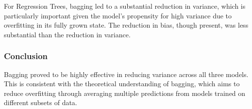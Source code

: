 \documentclass[12pt,titlepage]{article}
\begin{document}
For Regression Trees, bagging led to a substantial reduction in variance, which is particularly important given the model's propensity for high variance due to overfitting in its fully grown state. The reduction in bias, though present, was less substantial than the reduction in variance.

\subsubsection{Conclusion}

Bagging proved to be highly effective in reducing variance across all three models. This is consistent with the theoretical understanding of bagging, which aims to reduce overfitting through averaging multiple predictions from models trained on different subsets of data.
\end{document}
